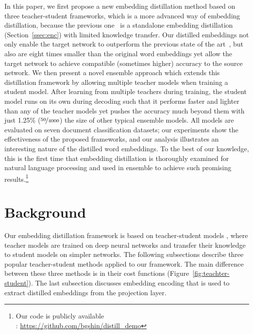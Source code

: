 \documentclass{article}
\begin{document}
In this paper, we first propose a new embedding distillation method based on three teacher-student frameworks, which is a more advanced way of embedding distillation, because the previous one~\cite{mou2016distilling} is a standalone embedding distillation (Section~\ref{ssec:enc}) with limited knowledge transfer. Our distilled embeddings not only enable the target network to outperform the previous state of the art~\cite{mou2016distilling}, but also are eight times smaller than the original word embeddings yet allow the target network to achieve compatible (sometimes higher) accuracy to the source network.
We then present a novel ensemble approach which extends this distillation framework by allowing multiple teacher models when training a student model. After learning from multiple teachers during training, the student model runs on its own during decoding such that it performs faster and lighter than any of the teacher models yet pushes the accuracy much beyond them with just 1.25\% ($\nicefrac{50}{4000}$) the size of other typical ensemble models. All models are evaluated on seven document classification datasets; our experiments show the effectiveness of the proposed frameworks, and our analysis illustrates an interesting nature of the distilled word embeddings.
To the best of our knowledge, this is the first time that embedding distillation is thoroughly examined for natural language processing and used in ensemble to achieve such promising results.\footnote{Our code is publicly available\\: \url{https://github.com/bgshin/distill_demo}}






%
 
\section{Background}
\label{sec:background}
\vspace{-0.5ex}
Our embedding distillation framework is based on teacher-student models \cite{ba2014deep,sau2016deep,hinton2015distilling}, where teacher models are trained on deep neural networks and transfer their knowledge to student models on simpler networks.
The following subsections describe three popular teacher-student methods applied to our framework.
The main difference between these three methods is in their cost functions (Figure~\ref{fig:teachter-student}).
The last subsection discusses embedding encoding that is used to extract distilled embeddings from the projection layer.
\end{document}
